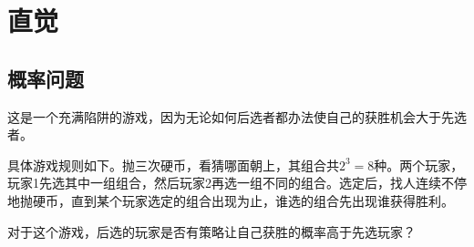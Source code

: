 
\chapter{直觉}
\label{chap:intuition}

\section{概率问题}
\label{sec:probability-issues}

\begin{example}[被针对的先手玩家]
  这是一个充满陷阱的游戏，因为无论如何后选者都办法使自己的获胜机会大于先选者。

  具体游戏规则如下。抛三次硬币，看猜哪面朝上，其组合共$2^3=8$种。两个玩家，玩家1先选其中一组组合，然后玩家2再选一组不同的组合。选定后，找人连续不停地抛硬币，直到某个玩家选定的组合出现为止，谁选的组合先出现谁获得胜利。

  对于这个游戏，后选的玩家是否有策略让自己获胜的概率高于先选玩家？
\end{example}
